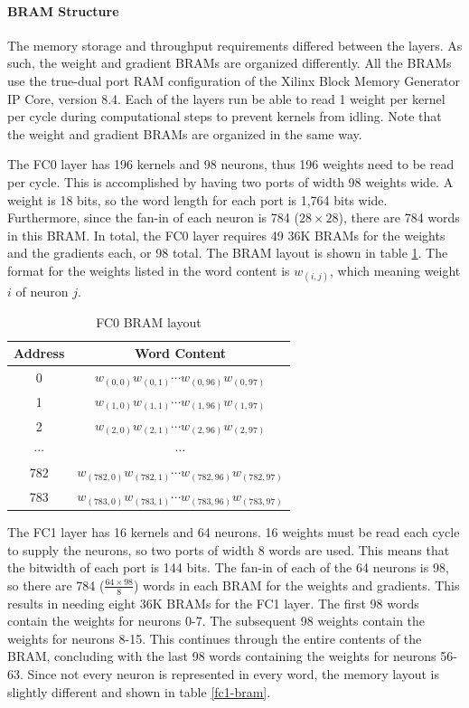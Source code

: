 \paragraph{BRAM Structure}
The memory storage and throughput requirements differed between the layers. As such, the weight and gradient BRAMs are organized differently. All the BRAMs use the true-dual port RAM configuration of the Xilinx Block Memory Generator IP Core, version 8.4. Each of the layers run be able to read 1 weight per kernel per cycle during computational steps to prevent kernels from idling. Note that the weight and gradient BRAMs are organized in the same way.

The FC0 layer has 196 kernels and 98 neurons, thus 196 weights need to be read per cycle.  This is accomplished by having two ports of width 98 weights wide. A weight is 18 bits, so the word length for each port is 1,764 bits wide. Furthermore, since the fan-in of each neuron is 784 ($28 \times 28$), there are 784 words in this BRAM. In total, the FC0 layer requires 49 36K BRAMs for the weights and the gradients each, or 98 total. The BRAM layout is shown in table \ref{fc0-bram}. The format for the weights listed in the word content is $w_{(i, j)}$, which meaning weight $i$ of neuron $j$.
\begin{table}
	\centering
	\begin{tabular}{|c|c|}
		\hline
		\textbf{Address} & \textbf{Word Content} \\\hline
		0 & $w_{(0, 0)}w_{(0, 1)}\cdots w_{(0, 96)}w_{(0, 97)}$\\
		1 & $w_{(1, 0)}w_{(1, 1)}\cdots w_{(1, 96)}w_{(1, 97)}$\\
		2 & $w_{(2, 0)}w_{(2, 1)}\cdots w_{(2, 96)}w_{(2, 97)}$\\
		$\cdots$ & $\cdots$ \\
		782 & $w_{(782, 0)}w_{(782, 1)}\cdots w_{(782, 96)}w_{(782, 97)}$\\
		783 & $w_{(783, 0)}w_{(783, 1)}\cdots w_{(783, 96)}w_{(783, 97)}$\\\hline
	\end{tabular}
	\caption{FC0 BRAM layout}	
	\label{fc0-bram}
\end{table}

The FC1 layer has 16 kernels and 64 neurons. 16 weights must be read each cycle to supply the neurons, so two ports of width 8 words are used. This means that the bitwidth of each port is 144 bits. The fan-in of each of the 64 neurons is 98, so there are 784 ($\frac{64\times98}{8}$) words in each BRAM for the weights and gradients. This results in needing eight 36K BRAMs for the FC1 layer. The first 98 words contain the weights for neurons 0-7. The subsequent 98 weights contain the weights for neurons 8-15. This continues through the entire contents of the BRAM, concluding with the last 98 words containing the weights for neurons 56-63. Since not every neuron is represented in every word, the memory layout is slightly different and shown in table \ref{fc1-bram}.

